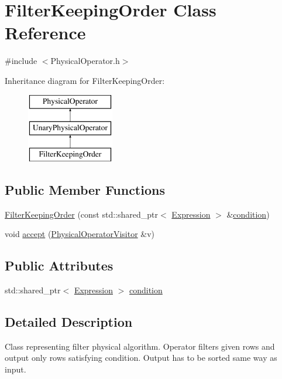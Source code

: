 \hypertarget{class_filter_keeping_order}{\section{Filter\+Keeping\+Order Class Reference}
\label{class_filter_keeping_order}
}


{\ttfamily \#include $<$Physical\+Operator.\+h$>$}

Inheritance diagram for Filter\+Keeping\+Order\+:\begin{figure}[H]
\begin{center}
\leavevmode
\includegraphics[height=3.000000cm]{class_filter_keeping_order}
\end{center}
\end{figure}
\subsection*{Public Member Functions}
\begin{DoxyCompactItemize}
\item 
\hyperlink{class_filter_keeping_order_abc6e727ea1b121b18bfd537a5c736676}{Filter\+Keeping\+Order} (const std\+::shared\+\_\+ptr$<$ \hyperlink{class_expression}{Expression} $>$ \&\hyperlink{class_filter_keeping_order_a9958c9755be1bcd46a9fa67116d07e67}{condition})
\item 
void \hyperlink{class_filter_keeping_order_a3d970e81588d96ac0d6538c17a22144c}{accept} (\hyperlink{class_physical_operator_visitor}{Physical\+Operator\+Visitor} \&v)
\end{DoxyCompactItemize}
\subsection*{Public Attributes}
\begin{DoxyCompactItemize}
\item 
std\+::shared\+\_\+ptr$<$ \hyperlink{class_expression}{Expression} $>$ \hyperlink{class_filter_keeping_order_a9958c9755be1bcd46a9fa67116d07e67}{condition}
\end{DoxyCompactItemize}


\subsection{Detailed Description}
Class representing filter physical algorithm. Operator filters given rows and output only rows satisfying condition. Output has to be sorted same way as input. 

